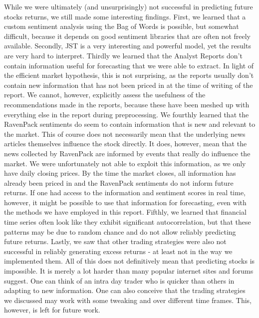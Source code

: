 While we were ultimately (and unsurprisingly) not successful in predicting future stocks returns, we still made some interesting findings. First, we learned that a custom sentiment analysis using the Bag of Words is possible, but somewhat difficult, because it depends on good sentiment libraries that are often not freely available. Secondly, JST is a very interesting and powerful model, yet the results are very hard to interpret. Thirdly we learned that the Analyst Reports don't contain information useful for forecasting that we were able to extract. In light of the efficient market hypothesis, this is not surprising, as the reports usually don't contain new information that has not been priced in at the time of writing of the report. We cannot, however, explicitly assess the usefulness of the  recommendations made in the reports, because these have been meshed up with everything else in the report during preprocessing. We fourthly learned that the RavenPack sentiments do seem to contain information that is new and relevant to the market. This of course does not necessarily mean that the underlying news articles themselves influence the stock directly. It does, however, mean that the news collected by RavenPack are informed by events that really do influence the market. We were unfortunately not able to exploit this information, as we only have daily closing prices. By the time the market closes, all information has already been priced in and the RavenPack sentiments do not inform future returns. If one had access to the information and sentiment scores in real time, however, it might be possible to use that information for forecasting, even with the methods we have employed in this report. Fifthly, we learned that financial time series often look like they exhibit significant autocorrelation, but that these patterns may be due to random chance and do not allow reliably predicting future returns. Lastly, we saw that other trading strategies were also not successful in reliably generating excess returns - at least not in the way we implemented them. All of this does not definitively mean that predicting stocks is impossible. It is merely a lot harder than many popular internet sites and forums suggest. One can think of an intra day trader who is quicker than others in adapting to new information. One can also conceive that the trading strategies we discussed may work with some tweaking and over different time frames. This, however, is left for future work. 







